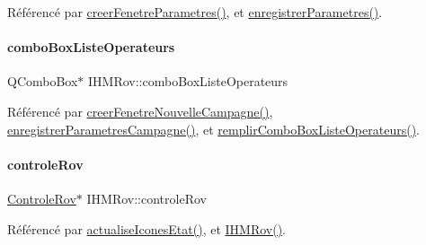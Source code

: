 Référencé par \hyperlink{class_i_h_m_rov_aed451139ac09ef18b7c92637761d80ce}{creer\+Fenetre\+Parametres()}, et \hyperlink{class_i_h_m_rov_a94d31f4e748f3e4549eab42c8bc7e367}{enregistrer\+Parametres()}.

\mbox{\label{class_i_h_m_rov_a32ee4423982fa3a78e59167ed2354f6e}} 
\paragraph{\texorpdfstring{combo\+Box\+Liste\+Operateurs}{comboBoxListeOperateurs}}
{\footnotesize\ttfamily Q\+Combo\+Box$\ast$ I\+H\+M\+Rov\+::combo\+Box\+Liste\+Operateurs\hspace{0.3cm}{\ttfamily [private]}}



Référencé par \hyperlink{class_i_h_m_rov_a08bf623a890df272f738c1ff8631213f}{creer\+Fenetre\+Nouvelle\+Campagne()}, \hyperlink{class_i_h_m_rov_a229194814bfb1fc94ab3cc86d6411921}{enregistrer\+Parametres\+Campagne()}, et \hyperlink{class_i_h_m_rov_a752a8dc2b3b68d536e94ff8bfb62f46f}{remplir\+Combo\+Box\+Liste\+Operateurs()}.

\mbox{\label{class_i_h_m_rov_a405b0c05970829fbf297ee0d26af9bca}} 
\paragraph{\texorpdfstring{controle\+Rov}{controleRov}}
{\footnotesize\ttfamily \hyperlink{class_controle_rov}{Controle\+Rov}$\ast$ I\+H\+M\+Rov\+::controle\+Rov\hspace{0.3cm}{\ttfamily [private]}}



Référencé par \hyperlink{class_i_h_m_rov_abbfcdc154a6ae7f941d186f6c90a5a2b}{actualise\+Icones\+Etat()}, et \hyperlink{class_i_h_m_rov_a5dac1fb4612866cc61f699a415e0ef6b}{I\+H\+M\+Rov()}.

\mbox{\label{class_i_h_m_rov_a95cd05040c8adc3c0513050661d532db}} 
